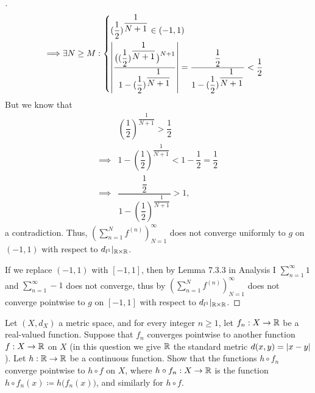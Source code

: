 \begin{proof}[]
\begin{align*}
    \implies & \exists N \geq M : \begin{dcases}
                                    (\dfrac{1}{2})^{\dfrac{1}{N + 1}} \in (-1, 1) \\
                                    \left\lvert\dfrac{\big((\dfrac{1}{2})^{\dfrac{1}{N + 1}}\big)^{N + 1}}{1 - (\dfrac{1}{2})^{\dfrac{1}{N + 1}}}\right\rvert = \dfrac{\dfrac{1}{2}}{1 - (\dfrac{1}{2})^{\dfrac{1}{N + 1}}} < \dfrac{1}{2}
                                  \end{dcases}
  \end{align*}
  But we know that
  \begin{align*}
             & (\dfrac{1}{2})^{\dfrac{1}{N + 1}} > \dfrac{1}{2}                        \\
    \implies & 1 - (\dfrac{1}{2})^{\dfrac{1}{N + 1}} < 1 - \dfrac{1}{2} = \dfrac{1}{2} \\
    \implies & \dfrac{\dfrac{1}{2}}{1 - (\dfrac{1}{2})^{\dfrac{1}{N + 1}}} > 1,
  \end{align*}
  a contradiction.
  Thus, \((\sum_{n = 1}^N f^{(n)})_{N = 1}^\infty\) does not converge uniformly to \(g\) on \((-1, 1)\) with respect to \(d_{l^1}|_{\mathbb{R} \times \mathbb{R}}\).

  If we replace \((-1, 1)\) with \([-1, 1]\), then by Lemma 7.3.3 in Analysis I \(\sum_{n = 1}^\infty 1\) and \(\sum_{n = 1}^\infty -1\) does not converge, thus by  \((\sum_{n = 1}^N f^{(n)})_{N = 1}^\infty\) does not converge pointwise to \(g\) on \([-1, 1]\) with respect to \(d_{l^1}|_{\mathbb{R} \times \mathbb{R}}\).
\end{proof}

\begin{ex}\label{ii:ex:3.2.3}
  Let \((X, d_X)\) a metric space, and for every integer \(n \geq 1\), let \(f_n : X \to \mathbb{R}\) be a real-valued function.
  Suppose that \(f_n\) converges pointwise to another function \(f : X \to \mathbb{R}\) on \(X\)
  (in this question we give \(\mathbb{R}\) the standard metric \(d(x, y) = \left\lvert x - y\right\rvert\)).
  Let \(h : \mathbb{R} \to \mathbb{R}\) be a continuous function.
  Show that the functions \(h \circ f_n\) converge pointwise to \(h \circ f\) on \(X\), where \(h \circ f_n : X \to \mathbb{R}\) is the function \(h \circ f_n(x) \coloneqq h\big(f_n(x)\big)\), and similarly for \(h \circ f\).
\end{ex}

